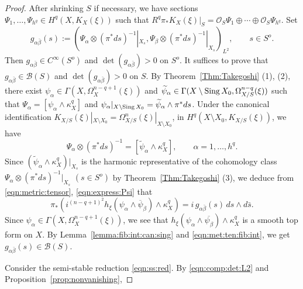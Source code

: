 \documentclass[amscd, leqno]{amsart}
\theoremstyle{plain}
\theoremstyle{definition}
\theoremstyle{remark}
\newenvironment{pf}{\begin{proof}}{\end{proof}}
\begin{document}
\begin{pf}
After shrinking $S$ if necessary, we have sections $\Psi_{1},\ldots,\Psi_{h^{q}}\in H^{q}(X, K_{X}(\xi))$ such that
$R^{q}\pi_{*}K_{X}(\xi)|_{S}={\mathcal O}_{S}\Psi_{1}\oplus\cdots\oplus{\mathcal O}_{S}\Psi_{h^{q}}$. 
Set
\begin{equation}
\label{eqn:metric:tensor}
g_{\alpha\bar{\beta}}(s) := ( \Psi_{\alpha}\otimes(\pi^{*}ds)^{-1}|_{X_{s}}, \Psi_{\beta}\otimes(\pi^{*}ds)^{-1}|_{X_{s}} )_{L^{2}},
\qquad
s\in S^{o}.
\end{equation}
Then $g_{\alpha\bar{\beta}}\in C^{\infty}(S^{o})$ and $\det(g_{\alpha\bar{\beta}})>0$ on $S^{o}$.
It suffices to prove that $g_{\alpha\bar{\beta}}\in{\mathcal B}(S)$ and $\det(g_{\alpha\bar{\beta}})>0$ on $S$. 
By Theorem~\ref{Thm:Takegoshi} (1), (2), there exist $\psi_{\alpha}\in \Gamma(X,\Omega_{X}^{n-q+1}(\xi))$ and 
$\widetilde{\psi}_{\alpha}\in \Gamma(X\setminus{\rm Sing}\,X_{0},\Omega_{X/S}^{n-q}(\xi))$ such that 
$\Psi_{\alpha}=[\psi_{\alpha}\wedge\kappa_{X}^{q}]$ and 
$\psi_{\alpha}|_{X\setminus{\rm Sing}\,X_{0}}=\widetilde{\psi}_{\alpha}\wedge\pi^{*}ds$. 
Under the canonical identification $K_{X/S}(\xi)|_{X\setminus X_{0}} = \Omega_{X/S}^{n}(\xi)|_{X\setminus X_{0}}$, 
in $H^{q}(X\setminus X_{0}, K_{X/S}(\xi))$, we have
\begin{equation}
\label{eqn:express:Psi}
\Psi_{\alpha}\otimes(\pi^{*}ds)^{-1} = [\widetilde{\psi}_{\alpha}\wedge\kappa_{X}^{q}],
\qquad
\alpha=1,\ldots, h^{q}.
\end{equation}
Since $(\widetilde{\psi}_{\alpha}\wedge\kappa_{X}^{q})|_{X_{s}}$ is the harmonic representative of the cohomology class 
$\Psi_{\alpha}\otimes(\pi^{*}ds)^{-1}|_{X_{s}}$ $(s\in S^{o})$ by Theorem~\ref{Thm:Takegoshi} (3), 
we deduce from \eqref{eqn:metric:tensor}, \eqref{eqn:express:Psi} that
\begin{equation}
\label{eqn:met:ten:fib:int}
\pi_{*}(i^{(n-q+1)^{2}}h_{\xi}(\psi_{\alpha}\wedge\overline{\psi}_{\beta})\wedge\kappa_{X}^{q}) = i\,g_{\alpha\bar{\beta}}(s)\,ds\wedge d\bar{s}.
\end{equation}
Since $\psi_{\alpha}\in \Gamma(X,\Omega_{X}^{n-q+1}(\xi))$, we see that 
$h_{\xi}(\psi_{\alpha}\wedge\overline{\psi_{\beta}})\wedge\kappa_{X}^{q}$ is a smooth top form on $X$. 
By Lemma~\ref{lemma:fib:int:can:sing} and \eqref{eqn:met:ten:fib:int}, we get $g_{\alpha\bar{\beta}}(s)\in{\mathcal B}(S)$.
\par
Consider the semi-stable reduction \eqref{eqn:ss:red}. By \eqref{eqn:comp:det:L2} and Proposition~\ref{prop:nonvanishing}, 

\end{pf}
\end{document}
